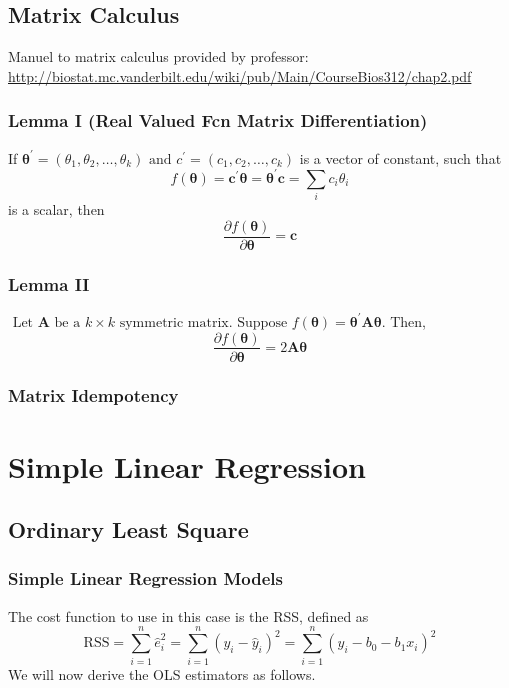 \documentclass[11pt]{article}
\begin{document}
\subsection{Matrix Calculus}
Manuel to matrix calculus provided by professor: \url{http://biostat.mc.vanderbilt.edu/wiki/pub/Main/CourseBios312/chap2.pdf}
\subsubsection{Lemma I (Real Valued Fcn Matrix Differentiation)} If $\boldsymbol{\theta}^{\prime}=\left(\theta_{1}, \theta_{2}, \ldots, \theta_{k}\right) \text { and } c^{\prime}=\left(c_{1}, c_{2}, \ldots, c_{k}\right)$ is a vector of constant, such that 
\begin{equation*}
    f(\boldsymbol{\theta})=\mathbf{c}^{\prime} \boldsymbol{\theta}=\boldsymbol{\theta}^{\prime} \mathbf{c}=\sum_{i} c_{i} \theta_{i}
\end{equation*}
is a scalar, then
\begin{equation*}
    \frac{\partial f(\boldsymbol{\theta})}{\partial \boldsymbol{\theta}}=\mathbf{c}
\end{equation*}
\subsubsection{Lemma II}
$\text { Let } \mathbf{A} \text { be a } k \times k \text { symmetric matrix. Suppose } f(\boldsymbol{\theta})=\boldsymbol{\theta}^{\prime} \mathbf{A} \boldsymbol{\theta}$. Then,
\begin{equation*}
    \frac{\partial f(\boldsymbol{\theta})}{\partial \boldsymbol{\theta}}=2 \mathbf{A} \boldsymbol{\theta}
\end{equation*}
\subsubsection{Matrix Idempotency}


\section{Simple Linear Regression}
\subsection{Ordinary Least Square}
\subsubsection{Simple Linear Regression Models}
The cost function to use in this case is the RSS, defined as
\begin{equation*}
    \mathrm{RSS}=\sum_{i=1}^{n} \hat{e}_{i}^{2}=\sum_{i=1}^{n}\left(y_{i}-\hat{y}_{i}\right)^{2}=\sum_{i=1}^{n}\left(y_{i}-b_{0}-b_{1} x_{i}\right)^{2}
\end{equation*}
We will now derive the OLS estimators as follows. 
\end{document}
